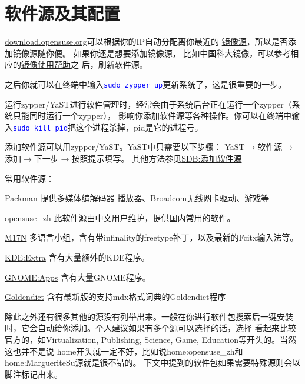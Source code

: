 \documentclass[11pt]{article}
\newcommand{\command}[1]{\texttt{\textcolor{blue}{#1}}}
\begin{document}
\section{软件源及其配置}
\url{download.opensuse.org}可以根据你的IP自动分配离你最近的
\href{http://mirrors.opensuse.org/}{镜像源}，所以是否添加镜像源随你便。
如果你还是想要添加镜像源，
比如中国科大镜像，可以参考相应的\href{https://lug.ustc.edu.cn/wiki/mirrors/help/opensuse}{镜像使用帮助}之
后，刷新软件源。

之后你就可以在终端中输入\command{sudo zypper up}更新系统了，这是很重要的一步。

运行zypper/YaST进行软件管理时，经常会由于系统后台正在运行一个zypper（系统只能同时运行一个zypper），
影响你添加软件源等各种操作。你可以在终端中输入\command{sudo kill pid}把这个进程杀掉，pid是它的进程号。

添加软件源可以用zypper/YaST。YaST中只需要以下步骤：
YaST$\rightarrow$软件源$\rightarrow$添加$\rightarrow$下一步$\rightarrow$按照提示填写。
其他方法参见\href{https://zh.opensuse.org/SDB:%E6%B7%BB%E5%8A%A0%E8%BD%AF%E4%BB%B6%E6%BA%90}{SDB:添加软件源}

常用软件源：\begin{compactdesc}
 \item[\href{http://mirrors.hust.edu.cn/packman/suse/openSUSE_13.1/}{Packman}]
 提供多媒体编解码器-播放器、Broadcom无线网卡驱动、游戏等
 \item[\href{http://download.opensuse.org/repositories/home:/opensuse_zh/openSUSE_13.1/}{opensuse\_zh}]
 此软件源由中文用户维护，提供国内常用的软件。
 \item[\href{http://download.opensuse.org/repositories/M17N/openSUSE_13.1/}{M17N}]
 多语言小组，含有带infinality的freetype补丁，以及最新的Fcitx输入法等。
 \item[\href{http://download.opensuse.org/repositories/KDE:/Extra/openSUSE_13.1/}{KDE:Extra}]
 含有大量额外的KDE程序。
 \item[\href{http://download.opensuse.org/repositories/GNOME:/Apps/openSUSE_13.1/}{GNOME:Apps}]
 含有大量GNOME程序。
 \item[\href{http://download.opensuse.org/repositories/office:/goldendict/openSUSE_13.1/}{Goldendict}]
 含有最新版的支持mdx格式词典的Goldendict程序
\end{compactdesc}

除此之外还有很多其他的源没有列举出来。一般在你进行软件包搜索后一键安装时，它会自动给你添加。个人建议如果有多个源可以选择的话，选择
看起来比较官方的，如Virtualization, Publishing, Science, Game, Education等开头的。当然这也并不是说
home开头就一定不好，比如说home:opensuse\_zh和home:MargueriteSu源就是很不错的。
下文中提到的软件包如果需要特殊源则会以脚注标记出来。
\end{document}
